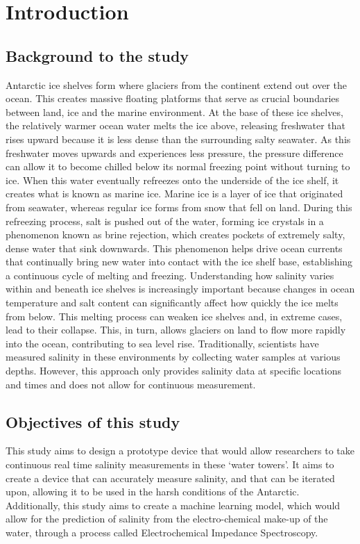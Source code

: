 \chapter{Introduction}

\section{Background to the study}
Antarctic ice shelves form where glaciers from the continent extend out over the ocean.
This creates massive floating platforms that serve as crucial boundaries between land, ice and the marine environment.
At the base of these ice shelves, the relatively warmer ocean water melts the ice above, releasing freshwater that rises upward because it is less dense than the surrounding salty seawater.
As this freshwater moves upwards and experiences less pressure, the pressure difference can allow it to become chilled below its normal freezing point without turning to ice.
When this water eventually refreezes onto the underside of the ice shelf, it creates what is known as marine ice.
Marine ice is a layer of ice that originated from seawater, whereas regular ice forms from snow that fell on land.
During this refreezing process, salt is pushed out of the water, forming ice crystals in a phenomenon known as brine rejection, which creates pockets of extremely salty, dense water that sink downwards.
This phenomenon helps drive ocean currents that continually bring new water into contact with the ice shelf base, establishing a continuous cycle of melting and freezing.
Understanding how salinity varies within and beneath ice shelves is increasingly important because changes in ocean temperature and salt content can significantly affect how quickly the ice melts from below.
This melting process can weaken ice shelves and, in extreme cases, lead to their collapse.
This, in turn, allows glaciers on land to flow more rapidly into the ocean, contributing to sea level rise.
Traditionally, scientists have measured salinity in these environments by collecting water samples at various depths.
However, this approach only provides salinity data at specific locations and times and does not allow for continuous measurement.

\section{Objectives of this study}
This study aims to design a prototype device that would allow researchers to take continuous real time salinity measurements in these `water towers'.
It aims to create a device that can accurately measure salinity, and that can be iterated upon, allowing it to be used in the harsh conditions of the Antarctic.
Additionally, this study aims to create a machine learning model, which would allow for the prediction of salinity from the electro-chemical make-up of the water, through a process called Electrochemical Impedance Spectroscopy.

